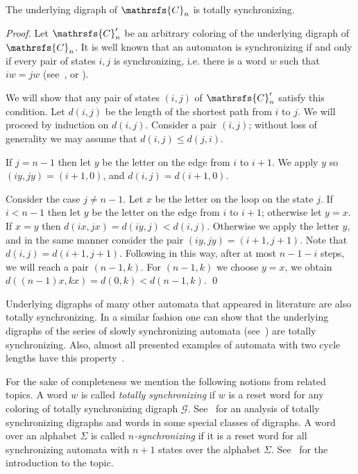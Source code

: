 \documentclass[runningheads]{llncs}
\begin{document}
\begin{proposition}
The underlying digraph of $\mathrsfs{C}_n$ is totally synchronizing.
\end{proposition}
\begin{proof}
Let $\mathrsfs{C}'_n$ be an arbitrary coloring of the underlying digraph of $\mathrsfs{C}_n$.
It is well known that an automaton is synchronizing if and only if every pair of states $i,j$ is synchronizing, i.e. there is a word $w$ such that $i w = j w$ (see~\cite{Cerny1964}, or \cite[Proposition~2.1]{Volkov2008Survey}).

We will show that any pair of states $(i, j)$ of $\mathrsfs{C}'_n$ satisfy this condition.
Let $d(i,j)$ be the length of the shortest path from $i$ to $j$.
We will proceed by induction on $d(i,j)$.
Consider a pair $(i,j)$; without loss of generality we may assume that $d(i,j) \leq d(j,i)$.

If $j = n-1$ then let $y$ be the letter on the edge from $i$ to $i+1$.
We apply $y$ so $(i y, j y) = (i+1, 0)$, and $d(i, j) = d(i+1, 0)$.

Consider the case $j \neq n-1$.
Let $x$ be the letter on the loop on the state $j$.
If $i < n-1$ then let $y$ be the letter on the edge from $i$ to $i+1$; otherwise let $y = x$.
If $x=y$ then $d(i x,j x) = d(i y, j) < d(i,j)$.
Otherwise we apply the letter $y$, and in the same manner consider the pair $(i y, j y) = (i+1, j+1)$.
Note that $d(i,j) = d(i+1 , j+1)$.
Following in this way, after at most $n-1-i$ steps, we will reach a pair $(n-1, k)$.
For $(n-1, k)$ we choose $y = x$, we obtain $d((n-1) x, k x) = d(0, k) < d(n-1, k)$.
\qed
\end{proof}

Underlying digraphs of many other automata that appeared in literature are also totally synchronizing.
In a similar fashion one can show that the underlying digraphs of the series of slowly synchronizing automata (see~\cite{AGV2013,KS2014SynchronizingAutomataWithLargeResetLengths}) are totally synchronizing. Also, almost all presented examples of automata with two cycle lengths have this property~\cite{GusevPribavkina2014ResetThresholdsOfAutomataWithTwoCycleLengths}.

For the sake of completeness we mention the following notions from related topics.
A word $w$ is called \emph{totally synchronizing} if $w$ is a reset word for any coloring of totally synchronizing digraph $\mathcal{G}$. See~\cite{Cardoso2014PhD} for an analysis of totally synchronizing digraphs and words in some special classes of digraphs. A word over an alphabet $\Sigma$ is called \emph{$n$-synchronizing} if it is a reset word for all synchronizing automata with $n + 1$ states over the alphabet $\Sigma$. See~\cite{Cherubini2007SynchronizingAndCollapsingWords} for the introduction to the topic.
\end{document}
